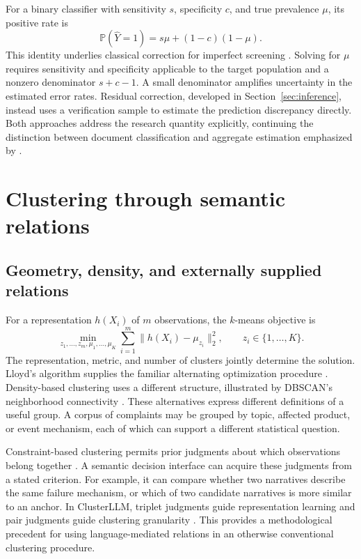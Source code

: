 \documentclass[11pt,a4paper]{article}
\newcommand{\Prob}{\mathbb{P}}
\begin{document}
For a binary classifier with sensitivity $s$, specificity $c$, and true prevalence $\mu$, its positive rate is
\begin{equation}
 \Prob(\widehat Y=1)=s\mu+(1-c)(1-\mu).
 \label{eq:prevalence}
\end{equation}
This identity underlies classical correction for imperfect screening \citep{rogan1978}. Solving for $\mu$ requires sensitivity and specificity applicable to the target population and a nonzero denominator $s+c-1$. A small denominator amplifies uncertainty in the estimated error rates. Residual correction, developed in Section~\ref{sec:inference}, instead uses a verification sample to estimate the prediction discrepancy directly. Both approaches address the research quantity explicitly, continuing the distinction between document classification and aggregate estimation emphasized by \citet{hopkins2010}.

\section{Clustering through semantic relations}\label{sec:clustering}

\subsection{Geometry, density, and externally supplied relations}

For a representation $h(X_i)$ of $m$ observations, the $k$-means objective is
\begin{equation}
 \min_{z_1,\ldots,z_m,\mu_1,\ldots,\mu_K}
 \sum_{i=1}^{m}\|h(X_i)-\mu_{z_i}\|_2^2,
 \qquad z_i\in\{1,\ldots,K\}.
 \label{eq:kmeans}
\end{equation}
The representation, metric, and number of clusters jointly determine the solution. Lloyd's algorithm supplies the familiar alternating optimization procedure \citep{lloyd1982}. Density-based clustering uses a different structure, illustrated by DBSCAN's neighborhood connectivity \citep{ester1996}. These alternatives express different definitions of a useful group. A corpus of complaints may be grouped by topic, affected product, or event mechanism, each of which can support a different statistical question.

Constraint-based clustering permits prior judgments about which observations belong together \citep{wagstaff2001}. A semantic decision interface can acquire these judgments from a stated criterion. For example, it can compare whether two narratives describe the same failure mechanism, or which of two candidate narratives is more similar to an anchor. In ClusterLLM, triplet judgments guide representation learning and pair judgments guide clustering granularity \citep{clusterllm2023}. This provides a methodological precedent for using language-mediated relations in an otherwise conventional clustering procedure.
\end{document}
